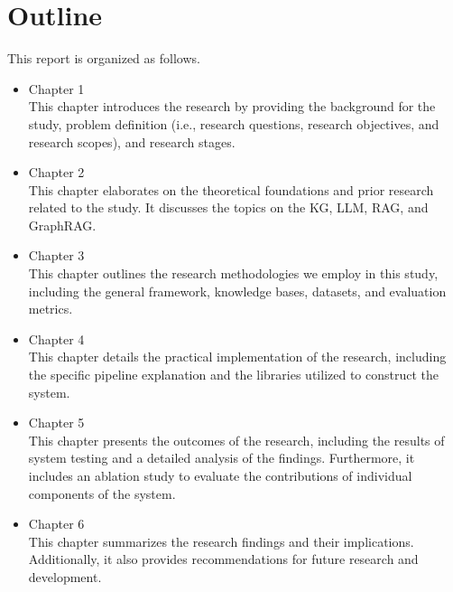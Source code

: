 \section{Outline}
\label{sec:sistematikaPenulisan}
This report is organized as follows.
\begin{itemize}
	\item Chapter 1 \babSatu \\
	    This chapter introduces the research by providing the background for the study, problem definition (i.e., research questions, research objectives, and research scopes), and research stages.
	\item Chapter 2 \babDua \\
	    This chapter elaborates on the theoretical foundations and prior research related to the study. It discusses the topics on the KG, LLM, RAG, and GraphRAG.
	\item Chapter 3 \babTiga \\
	    This chapter outlines the research methodologies we employ in this study, including the general framework, knowledge bases, datasets, and evaluation metrics.
	\item Chapter 4 \babEmpat \\
		This chapter details the practical implementation of the research, including the specific pipeline explanation and the libraries utilized to construct the system.
	\item Chapter 5 \babLima \\
	    This chapter presents the outcomes of the research, including the results of system testing and a detailed analysis of the findings. Furthermore, it includes an ablation study to evaluate the contributions of individual components of the system.
	\item Chapter 6 \kesimpulan \\
	    This chapter summarizes the research findings and their implications. Additionally, it also provides recommendations for future research and development.
\end{itemize}
